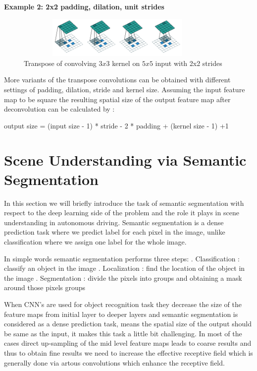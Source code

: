     \textbf{Example 2: 2x2 padding, dilation, unit strides}
     \begin{figure}[h]
    \centering
    \includegraphics[width=10cm, height =2cm]{images/transpose_case2.png}
    \caption{Transpose of convolving $3x3$ kernel on $5x5$ input with 2x2 strides \cite{https://doi.org/10.48550/arxiv.1603.07285}}
    \end{figure}
    
    More variants of the transpose convolutions can be obtained with different settings of padding, dilation, stride and kernel size. Assuming the input feature map to be square the resulting spatial size of the output feature map after deconvolution can be calculated by \cite{https://doi.org/10.48550/arxiv.1603.07285}:
    
       \begin{center}\newline
       output size = (input size - 1) * stride - 2 * padding + (kernel size - 1) +1
   \end{center}
    

    \section{Scene Understanding via Semantic Segmentation}
    In this section we will briefly introduce the task of semantic segmentation with respect to the deep learning side of the problem and the role it plays in scene understanding in autonomous driving. Semantic segmentation is a dense prediction task where we predict label for each pixel in the image, unlike classification where we assign one label for the whole image.
    
    In simple words semantic segmentation performs three steps: . Classification : classify an object in the image  . Localization : find the location of the object in the image . Segmentation : divide the pixels into groups and obtaining a mask around those pixels groups 
    
     When CNN's are used for object recognition task they decrease the size of the feature maps from initial layer to deeper layers and semantic segmentation is considered as a dense prediction task, means the spatial size of the output should be same as the input, it makes this task a little bit challenging. In most of the cases direct up-sampling of the mid level feature maps leads to coarse results and thus to obtain fine results we need to increase the effective receptive field which is generally done via artous convolutions which enhance the receptive field. 
     
